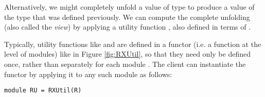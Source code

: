 Alternatively, we might completely unfold a value of type  to produce a value of the type  that was defined previously. We can compute the complete unfolding (also called the \emph{view}) by applying a utility function , also defined in terms of .

Typically, utility functions like  and  are defined in a functor (i.e. a function at the level of modules) like  in Figure \ref{fig:RXUtil}, so that they need only be defined once, rather than separately for each module . The client can instantiate the functor by applying it to any such module as follows:
\begin{lstlisting}[numbers=none]
module RU = RXUtil(R)
\end{lstlisting}



